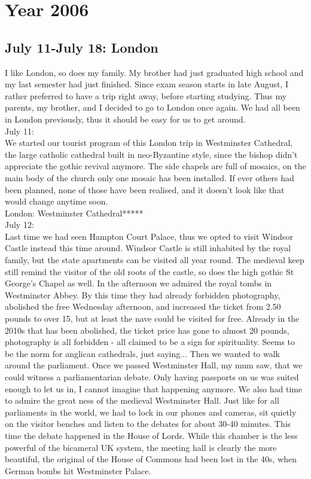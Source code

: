\chapter{Year 2006}
\label{2006}


\section{July 11-July 18: London}
\label{2006:London}

I like London, so does my family. My brother had just graduated high school and my last semester had just finished. Since exam season starts in late August, I rather preferred to have a trip right away, before starting studying. Thus my parents, my brother, and I decided to go to London once again. We had all been in London previously, thus it should be easy for us to get around.\\

July 11:\\
We started our tourist program of this London trip in Westminster Cathedral, the large catholic cathedral built in neo-Byzantine style, since the bishop didn't appreciate the gothic revival anymore. The side chapels are full of mosaics, on the main body of the church only one mosaic has been installed. If ever others had been planned, none of those have been realised, and it doesn't look like that would change anytime soon.\\

London: Westminster Cathedral*****\\

July 12:\\
Last time we had seen Hampton Court Palace, thus we opted to visit Windsor Castle instead this time around. Windsor Castle is still inhabited by the royal family, but the state apartments can be visited all year round. The medieval keep still remind the visitor of the old roots of the castle, so does the high gothic St George's Chapel as well. In the afternoon we admired the royal tombs in Westminster Abbey. By this time they had already forbidden photography, abolished the free Wednesday afternoon, and increased the ticket from 2.50 pounds to over 15, but at least the nave could be visited for free. Already in the 2010s that has been abolished, the ticket price has gone to almost 20 pounds, photography is all forbidden - all claimed to be a sign for spirituality. Seems to be the norm for anglican cathedrals, just saying... Then we wanted to walk around the parliament. Once we passed Westminster Hall, my mum saw, that we could witness a parliamentarian debate. Only having passports on us was suited enough to let us in, I cannot imagine that happening anymore. We also had time to admire the great ness of the medieval Westminster Hall. Just like for all parliaments in the world, we had to lock in our phones and cameras, sit quietly on the visitor benches and listen to the debates for about 30-40 minutes. This time the debate happened in the House of Lords. While this chamber is the less powerful of the bicameral UK system, the meeting hall is clearly the more beautiful, the original of the House of Commons had been lost in the 40s, when German bombs hit Westminster Palace.\\

